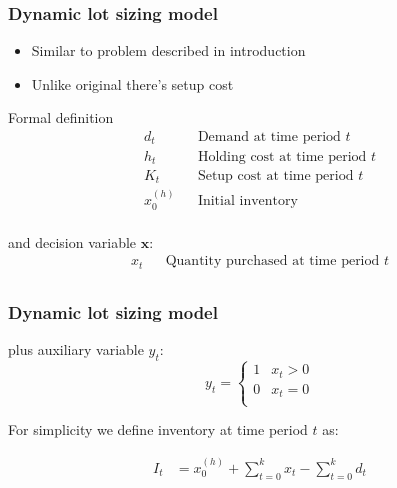\documentclass{beamer}
\begin{document}
\begin{frame}
    \frametitle{Dynamic lot sizing model}
    \begin{itemize}
        \item Similar to problem described in introduction
        \item Unlike original there's setup cost
    \end{itemize}

    \begin{block}{Formal definition}
        \begin{align*}
          d_t && \text{Demand at time period $t$} \\
          h_t && \text{Holding cost at time period $t$} \\
          K_t && \text{Setup cost at time period $t$} \\
          x^{(h)}_0 && \text{Initial inventory} \\
        \end{align*}

        and decision variable $\mathbf{x}$:
        \begin{align*}
                  x_t && \text{Quantity purchased at time period $t$}\\
        \end{align*}
    \end{block}
\end{frame}

\begin{frame}
    \frametitle{Dynamic lot sizing model}
    \begin{block}{}
        plus auxiliary variable $y_t$:
        \begin{equation*}
            y_t = \begin{cases}
                1 & x_t > 0 \\
                0 & x_t = 0 \\
            \end{cases}
        \end{equation*}

        For simplicity we define inventory at time period $t$ as:

        \begin{align*}
          I_t &= x^{(h)}_0 + \sum_{t=0}^k{x_t} - \sum_{t=0}^k{d_t}\\
        \end{align*}

    \end{block}
\end{frame}
\end{document}
